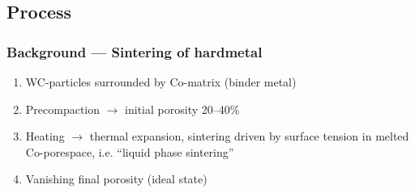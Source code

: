 \documentclass[11pt,mathserif]{beamer}
\begin{document}
\subsection{Process}
\begin{frame}
 \frametitle{Background --- Sintering of hardmetal}


 \begin{enumerate}
  \item WC-particles surrounded by Co-matrix (binder metal)
  \item Precompaction $\rightarrow$ initial porosity 20--40\%
  \item Heating $\rightarrow$ thermal expansion, sintering driven by surface tension in melted Co-porespace, i.e. ``liquid phase sintering''
  \item Vanishing final porosity (ideal state)
  


\end{enumerate}
\end{frame}
\end{document}
